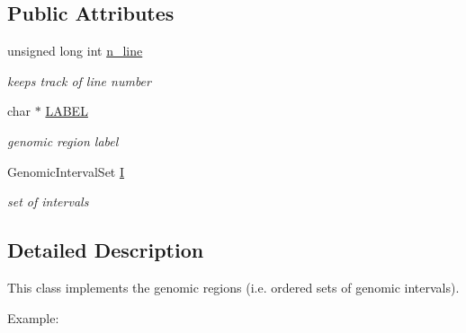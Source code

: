 \subsection*{Public Attributes}
\begin{DoxyCompactItemize}
\item 
\hypertarget{classGenomicRegion_aefe2255aeed5338060190ded05cb9c0c}{
unsigned long int \hyperlink{classGenomicRegion_aefe2255aeed5338060190ded05cb9c0c}{n\_\-line}}
\label{classGenomicRegion_aefe2255aeed5338060190ded05cb9c0c}

\begin{DoxyCompactList}\small\item\em keeps track of line number \end{DoxyCompactList}\item 
\hypertarget{classGenomicRegion_a7eeba95c1e87e100346688681e30ff24}{
char $\ast$ \hyperlink{classGenomicRegion_a7eeba95c1e87e100346688681e30ff24}{LABEL}}
\label{classGenomicRegion_a7eeba95c1e87e100346688681e30ff24}

\begin{DoxyCompactList}\small\item\em genomic region label \end{DoxyCompactList}\item 
\hypertarget{classGenomicRegion_ab10b86b03c258958818b00c21e3672a9}{
GenomicIntervalSet \hyperlink{classGenomicRegion_ab10b86b03c258958818b00c21e3672a9}{I}}
\label{classGenomicRegion_ab10b86b03c258958818b00c21e3672a9}

\begin{DoxyCompactList}\small\item\em set of intervals \end{DoxyCompactList}\end{DoxyCompactItemize}


\subsection{Detailed Description}
This class implements the genomic regions (i.e. ordered sets of genomic intervals). 

Example: 
 

